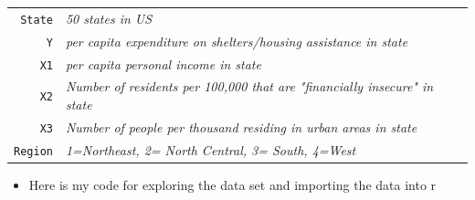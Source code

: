 \documentclass[12pt,letterpaper]{article}
\begin{document}
\begin{tabular}{r|l}
	\texttt{State} &\emph{50 states in US} \\
	\texttt{Y} & \emph{per capita expenditure on shelters/housing assistance in state}\\
	\texttt{X1} &\emph{per capita personal income in state} \\
	\texttt{X2} &  \emph{Number of residents per 100,000 that are "financially insecure" in state}\\
	\texttt{X3} &  \emph{Number of people per thousand residing in urban areas in state} \\
	\texttt{Region} &  \emph{1=Northeast, 2= North Central, 3= South, 4=West} \\
\end{tabular}

\begin{itemize}
	\item Here is my code for exploring the data set and importing the data into r
	
 

\end{itemize}
\end{document}
